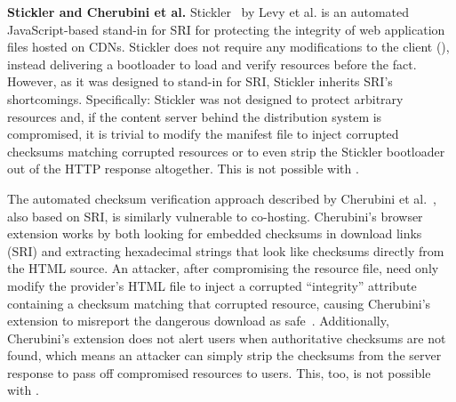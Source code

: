 \noindent\textbf{Stickler and Cherubini et al.} Stickler~\cite{Stickler} by Levy
et al. is an automated JavaScript-based stand-in for SRI for protecting the
integrity of web application files hosted on CDNs. Stickler does not require any
modifications to the client (), instead delivering a bootloader
to load and verify resources before the fact. However, as it was designed to
stand-in for SRI, Stickler inherits SRI's shortcomings. Specifically: Stickler
was not designed to protect arbitrary resources and, if the content server
behind the distribution system is compromised, it is trivial to modify the
manifest file to inject corrupted checksums matching corrupted resources or to
even strip the Stickler bootloader out of the HTTP response altogether. This is
not possible with \SYSTEM{}.

The automated checksum verification approach described by Cherubini et
al.~\cite{Cherubini}, also based on SRI, is similarly vulnerable to co-hosting.
Cherubini's browser extension works by both looking for embedded checksums in
download links (SRI) and extracting hexadecimal strings that look like checksums
directly from the HTML source. An attacker, after compromising the resource
file, need only modify the provider's HTML file to inject a corrupted
``integrity'' attribute containing a checksum matching that corrupted resource,
causing Cherubini's extension to misreport the dangerous download as
safe~\cite{Cherubini}. Additionally, Cherubini's extension does not alert users
when authoritative checksums are not found, which means an attacker can simply
strip the checksums from the server response to pass off compromised resources
to users. This, too, is not possible with \SYSTEM{}.
